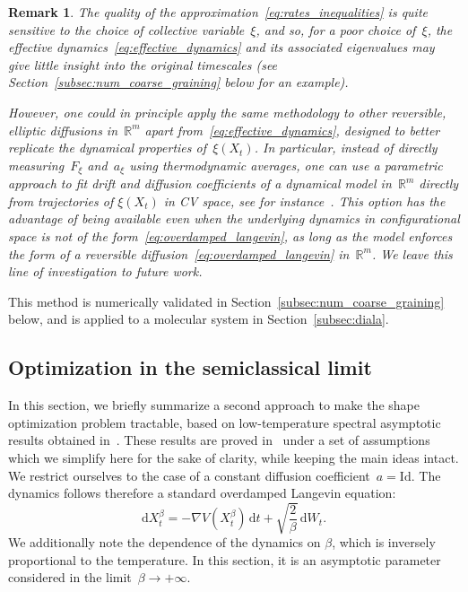 \documentclass[a4]{article}
\renewcommand{\d}{\mathrm{d}}
\newcommand{\R}{\mathbb{R}}
\newcommand{\1}{\mathbbm 1}
\newtheorem{remark}{Remark}
\begin{document}
    \begin{remark}
        \label{rem:other_eff_diffusion}
        The quality of the approximation~\eqref{eq:rates_inequalities} is quite sensitive to the choice of collective variable~$\xi$,
        and so, for a poor choice of~$\xi$, the effective dynamics~\eqref{eq:effective_dynamics} and its associated eigenvalues may give little insight into the original timescales (see Section~\ref{subsec:num_coarse_graining} below for an example).

        However, one could in principle apply the same methodology to other reversible, elliptic diffusions in~$\R^m$ apart from~\eqref{eq:effective_dynamics}, designed to better replicate the dynamical properties of~$\xi(X_t)$.
        In particular, instead of directly measuring~$F_\xi$ and~$a_\xi$ using thermodynamic averages, one can use a parametric approach to fit drift and diffusion coefficients of a dynamical model in~$\R^m$ directly from trajectories of $\xi(X_t)$ in CV space, see for instance~\cite{KPPK15}.
        This option has the advantage of being available even when the underlying dynamics in configurational space is not of the form~\eqref{eq:overdamped_langevin}, as long as the model enforces the form of a reversible diffusion~\eqref{eq:overdamped_langevin} in~$\R^m$.
        We leave this line of investigation to future work.
    \end{remark}
    This method is numerically validated in Section~\ref{subsec:num_coarse_graining} below, and is applied to a molecular system in Section~\ref{subsec:diala}.
    
    \subsection{Optimization in the semiclassical limit}
        \label{sec:semiclassic}
    In this section, we briefly summarize a second approach to make the shape optimization problem tractable, based on low-temperature spectral asymptotic results obtained in~\cite[Section 2.5]{BLS24}.
    These results are proved in~\cite{BLS24} under a set of assumptions which we simplify here for the sake of clarity, while keeping the main ideas intact.
    We restrict ourselves to the case of a constant diffusion coefficient~$a = \mathrm{Id}$. The dynamics follows therefore a standard overdamped Langevin equation:
    \begin{equation}
        \label{eq:overdamped_langevin_sc}
        \d X_t^\beta = -\nabla V\left(X_t^\beta\right)\,\d t + \sqrt{\frac{2}{\beta}}\,\d W_t.
    \end{equation}
    We additionally note the dependence of the dynamics on $\beta$, which is inversely proportional to the temperature. In this section, it is an asymptotic parameter considered in the limit~$\beta\to+\infty$.
\end{document}
